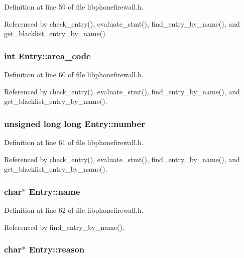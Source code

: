 Definition at line 59 of file libphonefirewall.h.

Referenced by check\_\-entry(), evaluate\_\-stmt(), find\_\-entry\_\-by\_\-name(), and get\_\-blacklist\_\-entry\_\-by\_\-name().\hypertarget{structEntry_9de7b96e5b65796bd35e9dc730dcd8b3}{
\subsubsection{\setlength{\rightskip}{0pt plus 5cm}int {\bf Entry::area\_\-code}}}
\label{structEntry_9de7b96e5b65796bd35e9dc730dcd8b3}




Definition at line 60 of file libphonefirewall.h.

Referenced by check\_\-entry(), evaluate\_\-stmt(), find\_\-entry\_\-by\_\-name(), and get\_\-blacklist\_\-entry\_\-by\_\-name().\hypertarget{structEntry_1f2177afed89936f82c130ae13fb107c}{
\subsubsection{\setlength{\rightskip}{0pt plus 5cm}unsigned long long {\bf Entry::number}}}
\label{structEntry_1f2177afed89936f82c130ae13fb107c}




Definition at line 61 of file libphonefirewall.h.

Referenced by check\_\-entry(), evaluate\_\-stmt(), find\_\-entry\_\-by\_\-name(), and get\_\-blacklist\_\-entry\_\-by\_\-name().\hypertarget{structEntry_272e382d3efed5f970c7939742ec9603}{
\subsubsection{\setlength{\rightskip}{0pt plus 5cm}char$\ast$ {\bf Entry::name}}}
\label{structEntry_272e382d3efed5f970c7939742ec9603}




Definition at line 62 of file libphonefirewall.h.

Referenced by find\_\-entry\_\-by\_\-name().\hypertarget{structEntry_2082cdbb815dfa8b81309cd395d32986}{
\subsubsection{\setlength{\rightskip}{0pt plus 5cm}char$\ast$ {\bf Entry::reason}}}
\label{structEntry_2082cdbb815dfa8b81309cd395d32986}




